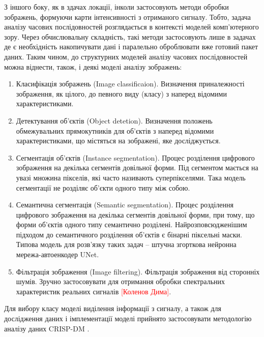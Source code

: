 З іншого боку, як в здачах локації, інколи застосовують методи обробки 
зображень, формуючи карти інтенсивності з отриманого сигналу. Тобто,
задача аналізу часових послідовностей розглядається в контексті 
моделей комп'ютерного зору. Через обчислювальну складність, такі методи 
застосовують лише в задачах де є необхідність накопичувати дані і паралельно 
оброблювати вже готовий пакет даних. Таким чином, до структурних моделей 
аналізу часових послідовностей можна віднести, також, і деякі моделі 
аналізу зображень:

\begin{enumerate}

	\item Класифікація зображень (Image classificaion). Визначення 
	приналежності зображення, як цілого, до певного виду (класу) з наперед 
	відомими характеристиками.

	\item Детектування об'єктів (Object detetion). Визначення положень 
	обмежувальних прямокутників для об'єктів з наперед відомими 
	характеристиками, що містяться на зображені, яке досліджується.

	\item Сегментація об'єктів (Instance segmentation). Процес розділення 
	цифрового зображення на декілька сегментів довільної форми. Під сегментом 
	мається на увазі множина пікселів, які часто називають суперпікселями. 
	Така модель сегментації не розділяє об'єкти одного типу між собою.

	\item Семантична сегментація (Semantic segmentation). Процес розділення 
	цифрового зображення на декілька сегментів довільної форми, при тому, що
	форми об'єктів одного типу семантично розділені. Найрозповсюдженішим 
	підходом до семантичного розділення об'єктів є бінарні піксельні маски. 
	Типова модель для розв'язку таких задач -- штучна згорткова нейронна 
	мережа-автоенкодер UNet.

	\item Фільтрація зображення (Image filtering). Фільтрація зображення 
	від сторонніх шумів. Зручно застосовувати для отримання обробки 
	спектральних характеристик реальних сигналів 
	\textcolor{red}{[Коленов Дима]}.

\end{enumerate}

Для вибору класу моделі виділення інформації з сигналу, а також для 
дослідження даних і імплементації моделі прийнято застосовувати  
методологію аналізу даних CRISP-DM \cite{imp:CRISPDM2000}.

